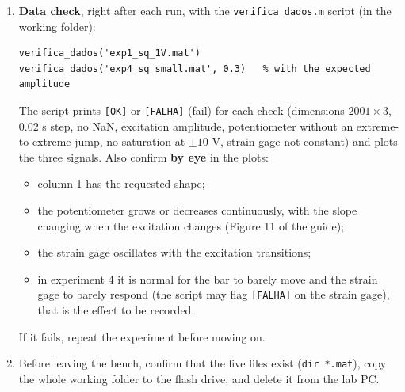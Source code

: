 \documentclass[a4paper,11pt]{article}
\begin{document}
\begin{enumerate}[label=$\square$, leftmargin=1.5em]
  \item \textbf{Data check}, right after each run, with the \texttt{verifica\_dados.m} script (in the working folder):
  \begin{verbatim}
verifica_dados('exp1_sq_1V.mat')
verifica_dados('exp4_sq_small.mat', 0.3)   % with the expected amplitude
  \end{verbatim}
  The script prints \texttt{[OK]} or \texttt{[FALHA]} (fail) for each check (dimensions $2001 \times 3$, $0.02$ s step, no NaN, excitation amplitude, potentiometer without an extreme-to-extreme jump, no saturation at $\pm 10$ V, strain gage not constant) and plots the three signals.
  Also confirm \textbf{by eye} in the plots:
  \begin{itemize}
    \item column 1 has the requested shape;
    \item the potentiometer grows or decreases continuously, with the slope changing when the excitation changes (Figure 11 of the guide);
    \item the strain gage oscillates with the excitation transitions;
    \item in experiment 4 it is normal for the bar to barely move and the strain gage to barely respond (the script may flag \texttt{[FALHA]} on the strain gage), that is the effect to be recorded.
  \end{itemize}
  If it fails, repeat the experiment before moving on.

  \item Before leaving the bench, confirm that the five files exist (\texttt{dir *.mat}), copy the whole working folder to the flash drive, and delete it from the lab PC.
\end{enumerate}
\end{document}
